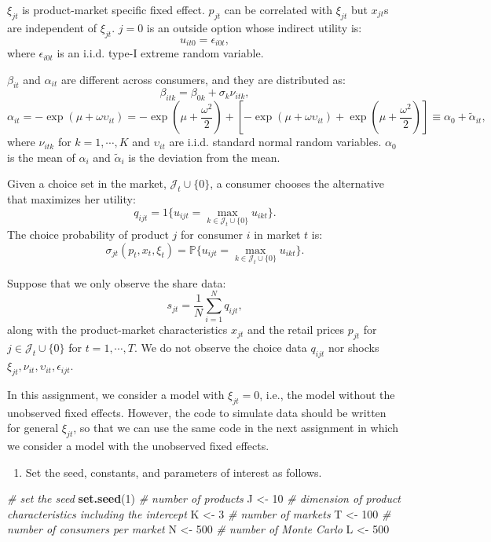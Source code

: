 \documentclass[
]{book}
\newenvironment{Shaded}{\begin{snugshade}}{\end{snugshade}}
\newcommand{\CommentTok}[1]{\textcolor[rgb]{0.56,0.35,0.01}{\textit{#1}}}
\newcommand{\DecValTok}[1]{\textcolor[rgb]{0.00,0.00,0.81}{#1}}
\newcommand{\FunctionTok}[1]{\textcolor[rgb]{0.13,0.29,0.53}{\textbf{#1}}}
\newcommand{\NormalTok}[1]{#1}
\newcommand{\OtherTok}[1]{\textcolor[rgb]{0.56,0.35,0.01}{#1}}
\providecommand{\tightlist}{%
  \setlength{\itemsep}{0pt}\setlength{\parskip}{0pt}}
\begin{document}
\(\xi_{jt}\) is product-market specific fixed effect. \(p_{jt}\) can be correlated with \(\xi_{jt}\) but \(x_{jt}\)s are independent of \(\xi_{jt}\). \(j = 0\) is an outside option whose indirect utility is:
\[
u_{it0} = \epsilon_{i0t},
\]
where \(\epsilon_{i0t}\) is an i.i.d. type-I extreme random variable.

\(\beta_{it}\) and \(\alpha_{it}\) are different across consumers, and they are distributed as:
\[
\beta_{itk} = \beta_{0k} + \sigma_k \nu_{itk},
\]
\[
\alpha_{it} = - \exp(\mu + \omega \upsilon_{it}) = - \exp(\mu + \frac{\omega^2}{2}) + [- \exp(\mu + \omega \upsilon_{it}) + \exp(\mu + \frac{\omega^2}{2})] \equiv \alpha_0 + \tilde{\alpha}_{it},
\]
where \(\nu_{itk}\) for \(k = 1, \cdots, K\) and \(\upsilon_{it}\) are i.i.d. standard normal random variables. \(\alpha_0\) is the mean of \(\alpha_i\) and \(\tilde{\alpha}_i\) is the deviation from the mean.

Given a choice set in the market, \(\mathcal{J}_t \cup \{0\}\), a consumer chooses the alternative that maximizes her utility:
\[
q_{ijt} = 1\{u_{ijt} = \max_{k \in \mathcal{J}_t \cup \{0\}} u_{ikt}\}.
\]
The choice probability of product \(j\) for consumer \(i\) in market \(t\) is:
\[
\sigma_{jt}(p_t, x_t, \xi_t) = \mathbb{P}\{u_{ijt} = \max_{k \in \mathcal{J}_t \cup \{0\}} u_{ikt}\}.
\]

Suppose that we only observe the share data:
\[
s_{jt} = \frac{1}{N} \sum_{i = 1}^N q_{ijt},
\]
along with the product-market characteristics \(x_{jt}\) and the retail prices \(p_{jt}\) for \(j \in \mathcal{J}_t \cup \{0\}\) for \(t = 1, \cdots, T\). We do not observe the choice data \(q_{ijt}\) nor shocks \(\xi_{jt}, \nu_{it}, \upsilon_{it}, \epsilon_{ijt}\).

In this assignment, we consider a model with \(\xi_{jt} = 0\), i.e., the model without the unobserved fixed effects. However, the code to simulate data should be written for general \(\xi_{jt}\), so that we can use the same code in the next assignment in which we consider a model with the unobserved fixed effects.

\begin{enumerate}
\def\labelenumi{\arabic{enumi}.}
\tightlist
\item
  Set the seed, constants, and parameters of interest as follows.
\end{enumerate}

\begin{Shaded}
\begin{Highlighting}[]
\CommentTok{\# set the seed}
\FunctionTok{set.seed}\NormalTok{(}\DecValTok{1}\NormalTok{)}
\CommentTok{\# number of products}
\NormalTok{J }\OtherTok{\textless{}{-}} \DecValTok{10}
\CommentTok{\# dimension of product characteristics including the intercept}
\NormalTok{K }\OtherTok{\textless{}{-}} \DecValTok{3}
\CommentTok{\# number of markets}
\NormalTok{T }\OtherTok{\textless{}{-}} \DecValTok{100}
\CommentTok{\# number of consumers per market}
\NormalTok{N }\OtherTok{\textless{}{-}} \DecValTok{500}
\CommentTok{\# number of Monte Carlo}
\NormalTok{L }\OtherTok{\textless{}{-}} \DecValTok{500}
\end{Highlighting}
\end{Shaded}
\end{document}
